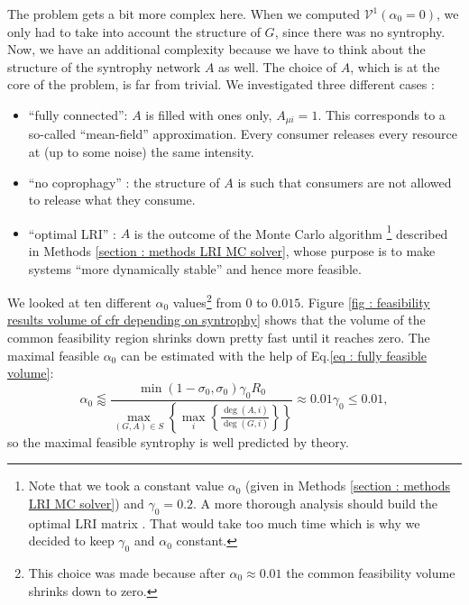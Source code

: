 \documentclass[12pt, titlepage]{report}
\begin{document}
The problem gets a bit more complex here. When we computed $\mathcal{V}^1(\alpha_0=0)$, we only had to take into account the structure of $G$, since there was no syntrophy. Now, we have an additional complexity because we have to think about the structure of the syntrophy network $A$ as well. The choice of $A$, which is at the core of the problem, is far from trivial. We investigated three different cases :
\begin{itemize}
  \item ``fully connected'': $A$ is filled with ones only, $A_{\mu i}=1$. This corresponds to a so-called ``mean-field'' approximation. Every consumer releases every resource at (up to some noise) the same intensity.
  \item ``no coprophagy'' : the structure of $A$ is such that consumers are not allowed to release what they consume.
  \item ``optimal LRI'' : $A$ is the outcome of the Monte Carlo algorithm \footnote{Note that we took a constant value $\alpha_0$ (given in Methods \ref{section : methods LRI MC solver}) and $\gamma_0=0.2$. A more thorough analysis should build the optimal LRI matrix . That would take too much time which is why we decided to keep $\gamma_0$ and $\alpha_0$ constant.}
 described in Methods \ref{section : methods LRI MC solver}, whose purpose is to make systems ``more dynamically stable'' and hence more feasible.
  \end{itemize}
  We looked at ten different $\alpha_0$ values\footnote{This choice was made because after $\alpha_0 \approx 0.01$ the common feasibility volume shrinks down to zero.} from $0$ to $0.015$. Figure \ref{fig : feasibility results volume of cfr depending on syntrophy} shows that the volume of the common feasibility region shrinks down pretty fast until it reaches zero. The maximal feasible $\alpha_0$ can be estimated with the help of Eq.\eqref{eq : fully feasible volume}:
  \begin{equation}
  \alpha_0 \lessapprox \frac{\min(1-\sigma_0, \sigma_0)\gamma_0 R_0}{\max_{(G,A)\in S}\left\{\max_i\left\{\frac{\deg(A,i)}{\deg(G,i)}\right\}\right\}} \approx 0.01 \gamma_0 \leq 0.01,
  \end{equation}
  so the maximal feasible syntrophy is well predicted by theory.
\end{document}
